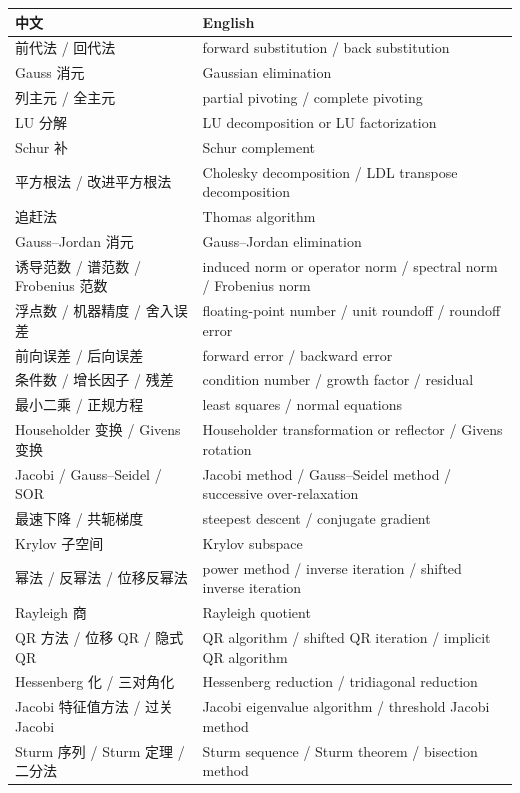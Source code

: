 \documentclass{article}
\begin{document}
\begin{center}
\begin{tabular}{@{}p{4.1cm}p{9.5cm}@{}}
\toprule
\textbf{中文} & \textbf{English}\\
\midrule
前代法 / 回代法 & forward substitution / back substitution\\
Gauss 消元 & Gaussian elimination\\
列主元 / 全主元 & partial pivoting / complete pivoting\\
LU 分解 & LU decomposition or LU factorization\\
Schur 补 & Schur complement\\
平方根法 / 改进平方根法 & Cholesky decomposition / LDL transpose decomposition\\
追赶法 & Thomas algorithm\\
Gauss--Jordan 消元 & Gauss--Jordan elimination\\
诱导范数 / 谱范数 / Frobenius 范数 & induced norm or operator norm / spectral norm / Frobenius norm\\
浮点数 / 机器精度 / 舍入误差 & floating-point number / unit roundoff / roundoff error\\
前向误差 / 后向误差 & forward error / backward error\\
条件数 / 增长因子 / 残差 & condition number / growth factor / residual\\
最小二乘 / 正规方程 & least squares / normal equations\\
Householder 变换 / Givens 变换 & Householder transformation or reflector / Givens rotation\\
Jacobi / Gauss--Seidel / SOR & Jacobi method / Gauss--Seidel method / successive over-relaxation\\
最速下降 / 共轭梯度 & steepest descent / conjugate gradient\\
Krylov 子空间 & Krylov subspace\\
幂法 / 反幂法 / 位移反幂法 & power method / inverse iteration / shifted inverse iteration\\
Rayleigh 商 & Rayleigh quotient\\
QR 方法 / 位移 QR / 隐式 QR & QR algorithm / shifted QR iteration / implicit QR algorithm\\
Hessenberg 化 / 三对角化 & Hessenberg reduction / tridiagonal reduction\\
Jacobi 特征值方法 / 过关 Jacobi & Jacobi eigenvalue algorithm / threshold Jacobi method\\
Sturm 序列 / Sturm 定理 / 二分法 & Sturm sequence / Sturm theorem / bisection method\\
\bottomrule
\end{tabular}
\end{center}
\end{document}
